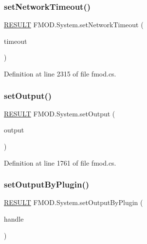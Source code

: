 \subsubsection{\texorpdfstring{set\+Network\+Timeout()}{setNetworkTimeout()}}
{\footnotesize\ttfamily \hyperlink{namespace_f_m_o_d_a305d1176ef3f8c8815861a60407ac33d}{R\+E\+S\+U\+LT} F\+M\+O\+D.\+System.\+set\+Network\+Timeout (\begin{DoxyParamCaption}\item[{int}]{timeout }\end{DoxyParamCaption})}



Definition at line 2315 of file fmod.\+cs.

\mbox{\label{class_f_m_o_d_1_1_system_a3c0972e6977b3ec97e45b5b1344c892e}} 
\subsubsection{\texorpdfstring{set\+Output()}{setOutput()}}
{\footnotesize\ttfamily \hyperlink{namespace_f_m_o_d_a305d1176ef3f8c8815861a60407ac33d}{R\+E\+S\+U\+LT} F\+M\+O\+D.\+System.\+set\+Output (\begin{DoxyParamCaption}\item[{\hyperlink{namespace_f_m_o_d_a79371777bf570d74477038541f318485}{O\+U\+T\+P\+U\+T\+T\+Y\+PE}}]{output }\end{DoxyParamCaption})}



Definition at line 1761 of file fmod.\+cs.

\mbox{\label{class_f_m_o_d_1_1_system_adb9658d5d930695dd958740d11cd18ec}} 
\subsubsection{\texorpdfstring{set\+Output\+By\+Plugin()}{setOutputByPlugin()}}
{\footnotesize\ttfamily \hyperlink{namespace_f_m_o_d_a305d1176ef3f8c8815861a60407ac33d}{R\+E\+S\+U\+LT} F\+M\+O\+D.\+System.\+set\+Output\+By\+Plugin (\begin{DoxyParamCaption}\item[{uint}]{handle }\end{DoxyParamCaption})}



